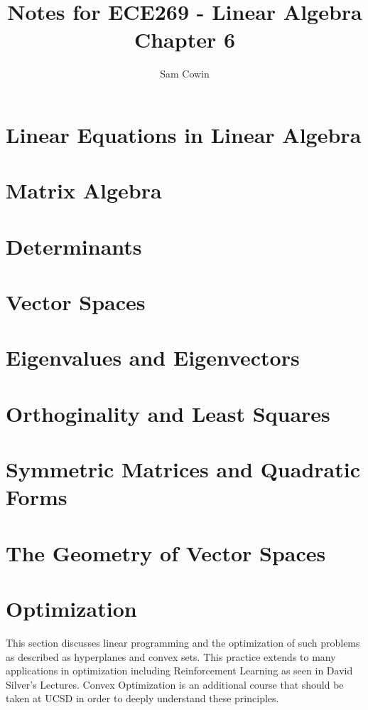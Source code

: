 \documentclass[12pt]{article}
\begin{document}
\setlength{\abovedisplayskip}{0pt}
\setlength{\belowdisplayskip}{0pt}
\setlength{\abovedisplayshortskip}{0pt}
\setlength{\belowdisplayshortskip}{0pt}

\title{Notes for ECE269 - Linear Algebra \\
\large Chapter 6}
\author{Sam Cowin}
\maketitle

\section{Linear Equations in Linear Algebra}
\section{Matrix Algebra}
\section{Determinants}
\section{Vector Spaces}
\section{Eigenvalues and Eigenvectors}
\section{Orthoginality and Least Squares}
\section{Symmetric Matrices and Quadratic Forms}
\section{The Geometry of Vector Spaces}
\section{Optimization}
This section discusses linear programming and the optimization of such problems as described as hyperplanes and convex sets. This practice extends to many applications in optimization 
including Reinforcement Learning as seen in David Silver's Lectures. Convex Optimization is an additional course that should be taken at UCSD in order to deeply understand these 
principles. 
\end{document}

